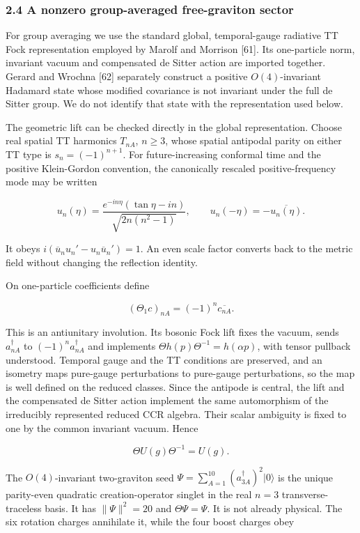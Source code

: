 \documentclass[
]{article}
\begin{document}
\subsubsection{2.4 A nonzero group-averaged free-graviton
sector}\label{a-nonzero-group-averaged-free-graviton-sector}

For group averaging we use the standard global, temporal-gauge radiative
TT Fock representation employed by Marolf and Morrison {[}61{]}. Its
one-particle norm, invariant vacuum and compensated de Sitter action are
imported together. Gerard and Wrochna {[}62{]} separately construct a
positive \(O(4)\)-invariant Hadamard state whose modified covariance is
not invariant under the full de Sitter group. We do not identify that
state with the representation used below.

The geometric lift can be checked directly in the global representation.
Choose real spatial TT harmonics \(T_{nA}\), \(n\geq3\), whose spatial
antipodal parity on either TT type is \(s_n=(-1)^{n+1}\). For
future-increasing conformal time and the positive Klein-Gordon
convention, the canonically rescaled positive-frequency mode may be
written

\[
u_n(\eta)=\frac{e^{-in\eta}(\tan\eta-in)}
{\sqrt{2n(n^2-1)}},
\qquad u_n(-\eta)=-\overline{u_n(\eta)}.
\]

It obeys \(i(\overline u_nu_n'-u_n\overline u_n')=1\). An even scale
factor converts back to the metric field without changing the reflection
identity.

On one-particle coefficients define

\[
(\Theta_1c)_{nA}=(-1)^n\overline{c_{nA}}.
\]

This is an antiunitary involution. Its bosonic Fock lift fixes the
vacuum, sends \(a^\dagger_{nA}\) to \((-1)^na^\dagger_{nA}\) and
implements \(\Theta h(p)\Theta^{-1}=h(\alpha p)\), with tensor pullback
understood. Temporal gauge and the TT conditions are preserved, and an
isometry maps pure-gauge perturbations to pure-gauge perturbations, so
the map is well defined on the reduced classes. Since the antipode is
central, the lift and the compensated de Sitter action implement the
same automorphism of the irreducibly represented reduced CCR algebra.
Their scalar ambiguity is fixed to one by the common invariant vacuum.
Hence

\[
\Theta U(g)\Theta^{-1}=U(g).
\]

The \(O(4)\)-invariant two-graviton seed
\(\Psi=\sum_{A=1}^{10}(a^\dagger_{3A})^2|0\rangle\) is the unique
parity-even quadratic creation-operator singlet in the real \(n=3\)
transverse-traceless basis. It has \(\|\Psi\|^2=20\) and
\(\Theta\Psi=\Psi\). It is not already physical. The six rotation
charges annihilate it, while the four boost charges obey
\end{document}

